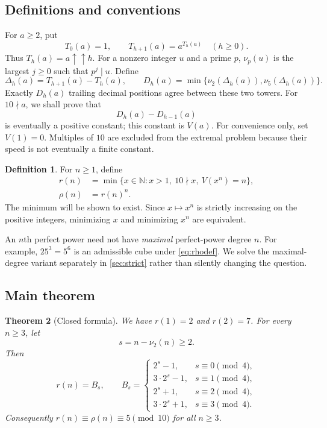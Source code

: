 \documentclass[11pt,a4paper]{article}
\newtheorem{theorem}{Theorem}[section]
\theoremstyle{definition}
\newtheorem{definition}[theorem]{Definition}
\newcommand{\N}{\mathbb N}
\begin{document}
\subsection{Definitions and conventions}
For $a\ge2$, put
\begin{equation}
T_0(a)=1,\qquad T_{h+1}(a)=a^{T_h(a)}\quad(h\ge0).
\label{eq:tower}
\end{equation}
Thus $T_h(a)=a\uparrow\uparrow h$. For a nonzero integer $u$ and a prime
$p$, $\nu_p(u)$ is the largest $j\ge0$ such that $p^j\mid u$.
Define
\begin{equation}
\Delta_h(a)=T_{h+1}(a)-T_h(a),\qquad
D_h(a)=\min\{\nu_2(\Delta_h(a)),\nu_5(\Delta_h(a))\}.
\label{eq:delta}
\end{equation}
Exactly $D_h(a)$ trailing decimal positions agree between these two
towers. For $10\nmid a$, we shall prove that
\[
D_h(a)-D_{h-1}(a)
\]
is eventually a positive constant; this constant is $V(a)$.
For convenience only, set $V(1)=0$. Multiples of $10$ are excluded from
the extremal problem because their speed is not eventually a finite
constant.

\begin{definition}
For $n\ge1$, define
\begin{align}
r(n)&=\min\{x\in\N:x>1,\ 10\nmid x,\ V(x^n)=n\},\label{eq:rdef}\\
\rho(n)&=r(n)^n.\label{eq:rhodef}
\end{align}
The minimum will be shown to exist. Since $x\mapsto x^n$ is strictly
increasing on the positive integers, minimizing $x$ and minimizing $x^n$
are equivalent.
\end{definition}

An $n$th perfect power need not have \emph{maximal} perfect-power degree
$n$. For example, $25^3=5^6$ is an admissible cube under
\eqref{eq:rhodef}. We solve the maximal-degree variant separately in
\cref{sec:strict} rather than silently changing the question.

\subsection{Main theorem}
\begin{theorem}[Closed formula]
\label{thm:main}
We have $r(1)=2$ and $r(2)=7$. For every $n\ge3$, let
\[
s=n-\nu_2(n)\ge2.
\]
Then
\begin{equation}
r(n)=B_s,
\qquad
B_s=\begin{cases}
2^s-1,&s\equiv0\pmod4,\\
3\cdot2^s-1,&s\equiv1\pmod4,\\
2^s+1,&s\equiv2\pmod4,\\
3\cdot2^s+1,&s\equiv3\pmod4.
\end{cases}
\label{eq:main}
\end{equation}
Consequently $r(n)\equiv\rho(n)\equiv5\pmod{10}$ for all $n\ge3$.
\end{theorem}
\end{document}

